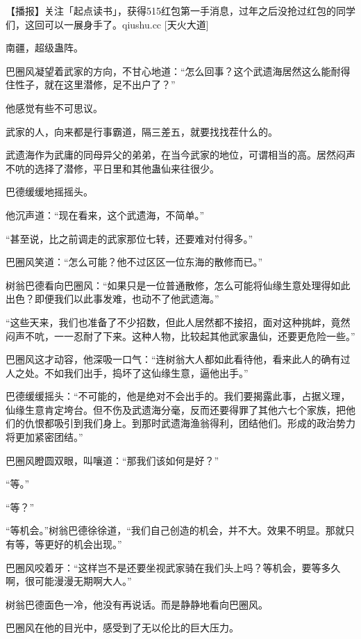 
\begin{this_body}

【播报】关注「起点读书」，获得515红包第一手消息，过年之后没抢过红包的同学们，这回可以一展身手了。qiushu.cc [天火大道]

南疆，超级蛊阵。

巴圈风凝望着武家的方向，不甘心地道：“怎么回事？这个武遗海居然这么能耐得住性子，就在这里潜修，足不出户了？”

他感觉有些不可思议。

武家的人，向来都是行事霸道，隔三差五，就要找找茬什么的。

武遗海作为武庸的同母异父的弟弟，在当今武家的地位，可谓相当的高。居然闷声不吭的选择了潜修，平日里和其他蛊仙来往很少。

巴德缓缓地摇摇头。

他沉声道：“现在看来，这个武遗海，不简单。”

“甚至说，比之前调走的武家那位七转，还要难对付得多。”

巴圈风笑道：“怎么可能？他不过区区一位东海的散修而已。”

树翁巴德看向巴圈风：“如果只是一位普通散修，怎么可能将仙缘生意处理得如此出色？即便我们以此事发难，也动不了他武遗海。”

“这些天来，我们也准备了不少招数，但此人居然都不接招，面对这种挑衅，竟然闷声不吭，一一忍耐了下来。这种人物，比较起其他武家蛊仙，还要更危险一些。”

巴圈风这才动容，他深吸一口气：“连树翁大人都如此看待他，看来此人的确有过人之处。不如我们出手，捣坏了这仙缘生意，逼他出手。”

巴德缓缓摇头：“不可能的，他是绝对不会出手的。我们要揭露此事，占据义理，仙缘生意肯定垮台。但不伤及武遗海分毫，反而还要得罪了其他六七个家族，把他们的仇恨都吸引到我们身上。到那时武遗海渔翁得利，团结他们。形成的政治势力将更加紧密团结。”

巴圈风瞪圆双眼，叫嚷道：“那我们该如何是好？”

“等。”

“等？”

“等机会。”树翁巴德徐徐道，“我们自己创造的机会，并不大。效果不明显。那就只有等，等更好的机会出现。”

巴圈风咬着牙：“这样岂不是还要坐视武家骑在我们头上吗？等机会，要等多久啊，很可能漫漫无期啊大人。”

树翁巴德面色一冷，他没有再说话。而是静静地看向巴圈风。

巴圈风在他的目光中，感受到了无以伦比的巨大压力。


\end{this_body}
